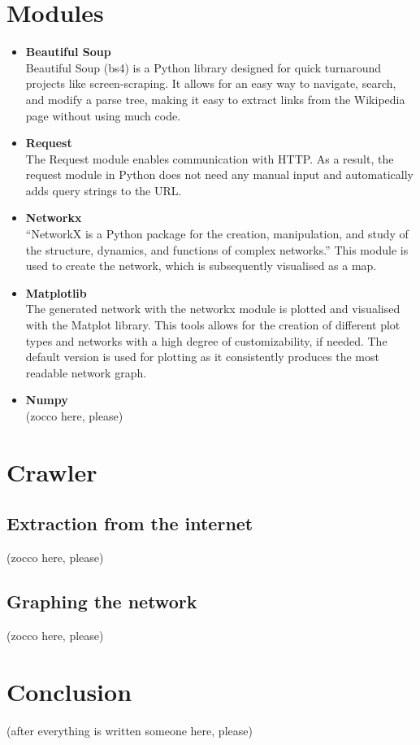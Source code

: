 \documentclass[10pt]{article}
\begin{document}
\section{Modules}

 \begin{itemize}    %
        \item\textbf{Beautiful Soup}\\
	Beautiful Soup (bs4) is a Python library designed for quick turnaround projects like screen-scraping. It allows for an easy way to navigate, search, and modify a parse tree, making it 	easy to extract links from the Wikipedia page without using much code. \cite{cru} 
 
        \item \textbf{Request}\\
 	The Request module enables communication with HTTP. As a result, the request module in Python does not need any manual input and automatically adds query strings to the  	
	URL.   \cite{req}
	
        \item \textbf{Networkx}\\
	``NetworkX is a Python package for the creation, manipulation, and study of the structure, dynamics, and functions of complex networks.'' \cite{net} This module is used to create 
	the network, which is subsequently visualised as a map. 
	
        \item \textbf{Matplotlib}\\
        The generated network with the networkx module is plotted and visualised with the Matplot library. This tools allows for the creation of different plot types and networks with a high 	
        degree of customizability, if needed. The default version is used for plotting as it consistently produces the most readable network graph. 
        
        \item \textbf{Numpy}\\
        
        (zocco here, please)
        
        
    \end{itemize}
 

\section{Crawler}
	\subsection{Extraction from the internet}
	
	(zocco here, please)
	
	\subsection{Graphing the network}
	
	(zocco here, please)
	
\section{Conclusion}

(after everything is written someone here, please)



\newpage
 

\end{document}
